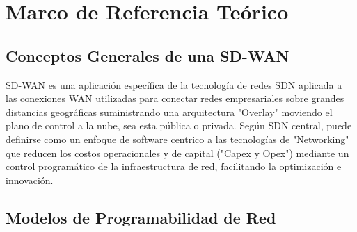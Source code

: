 

\section{Marco de Referencia Teórico} %
\label{sec:Marco de Referencia Teórico}

\subsection{Conceptos Generales de una SD-WAN}
\label{sec:Conceptos Generales de una SD-WAN}
SD-WAN es una aplicación específica de la tecnología de redes SDN aplicada a las conexiones WAN utilizadas para conectar redes empresariales sobre grandes distancias geográficas suministrando una arquitectura "Overlay" moviendo el plano de control a la nube, sea esta pública o privada. Según SDN central, puede definirse como un enfoque de software centrico a las tecnologías de "Networking" que reducen los costos operacionales y de capital ("Capex y Opex") mediante un control programático de la infraestructura de red, facilitando la optimización e innovación.
\\
\subsection{Modelos de Programabilidad de Red}
\label{sec:Modelos de Programabilidad de Red}

